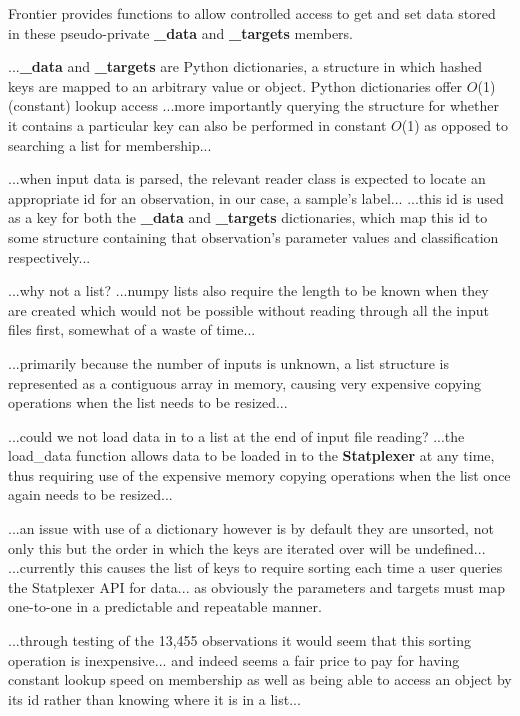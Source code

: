 Frontier provides functions to allow controlled access to get and set data
stored in these pseudo-private \textbf{\_data} and \textbf{\_targets} members.

...\textbf{\_data} and \textbf{\_targets} are Python dictionaries, a structure
in which hashed keys are mapped to an arbitrary value or object. Python
dictionaries offer $O$(1) (constant) lookup\citep{py:timecomplexity} access
...more importantly querying the structure for whether it contains a particular
key can also be performed in constant $O$(1) as opposed to searching a list for
membership...

...when input data is parsed, the relevant reader class is expected to locate an
appropriate id for an observation, in our case, a sample's label...
...this id is used as a key for both the \textbf{\_data} and \textbf{\_targets}
dictionaries, which map this id to some structure containing that observation's
parameter values and classification respectively...

...why not a list?
...numpy lists also require the length to be known when they are created which
would not be possible without reading through all the input files first,
somewhat of a waste of time...

...primarily because the number of inputs is unknown, a list structure is
represented as a contiguous array in memory, causing very expensive copying
operations when the list needs to be resized...

...could we not load data in to a list at the end of input file reading?
...the load\_data function allows data to be loaded in to the
\textbf{Statplexer} at any time, thus requiring use of the expensive memory
copying operations when the list once again needs to be resized...


...an issue with use of a dictionary however is by default they are unsorted,
not only this but the order in which the keys are iterated over will be
undefined...
...currently this causes the list of keys to require sorting each time a user
queries the Statplexer API for data... as obviously the parameters and targets
must map one-to-one in a predictable and repeatable manner.

...through testing of the 13,455 observations it would seem that this sorting
operation is inexpensive... and indeed seems a fair price to pay for having
constant lookup speed on membership as well as being able to access an object by
its id rather than knowing where it is in a list...

